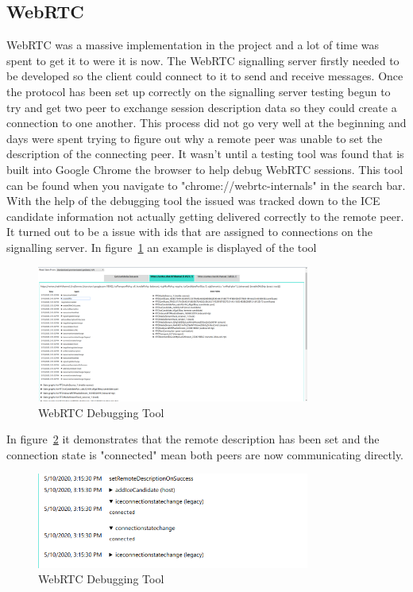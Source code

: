 \subsection{WebRTC}
WebRTC was a massive implementation in the project and a lot of time was spent to get it to were it is now. The WebRTC signalling server firstly needed to be developed so the client could connect to it to send and receive messages. Once the protocol has been set up correctly on the signalling server testing begun to try and get two peer to exchange session description data so they could create a connection to one another. This process did not go very well at the beginning and days were spent trying to figure out why a remote peer was unable to set the description of the connecting peer. It wasn't until a testing tool was found that is built into Google Chrome the browser to help debug WebRTC sessions. This tool can be found when you navigate to "chrome://webrtc-internals" in the search bar. With the help of the debugging tool the issued was tracked down to the ICE candidate information not actually getting delivered correctly to the remote peer. It turned out to be a issue with ids that are assigned to connections on the signalling server. In figure~\ref{image:webrtcDebugTool} an example is displayed of the tool


\begin{figure}[h!]
    \caption{WebRTC Debugging Tool}
    \label{image:webrtcDebugTool}
    \centering
    \includegraphics[width=0.8\textwidth]{images/screenshotsOfPages/webrtcTestingTools.png}
\end{figure}


In figure~\ref{image:webrtcDebugToolConnected} it demonstrates that the remote description has been set and the connection state is "connected" mean both peers are now communicating directly.   


\begin{figure}[h!]
    \caption{WebRTC Debugging Tool}
    \label{image:webrtcDebugToolConnected}
    \centering
    \includegraphics[width=0.8\textwidth]{images/screenshotsOfPages/webrtcTestingToolConnected.png}
\end{figure}

